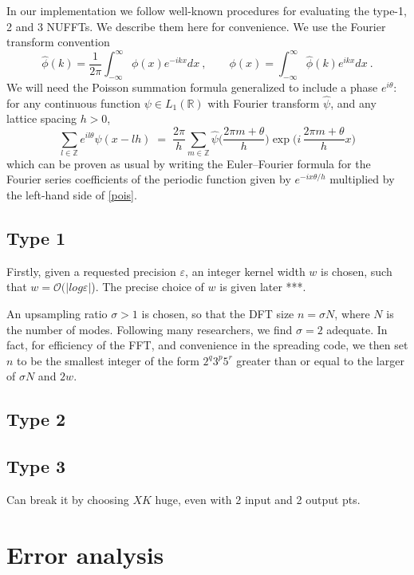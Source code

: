 \documentclass[10pt]{article}
\newcommand{\be}{\begin{equation}}
\newcommand{\ee}{\end{equation}}
\newcommand{\RR}{\mathbb{R}}
\newcommand{\ZZ}{\mathbb{Z}}
\newcommand{\eps}{\varepsilon}
\newcommand{\bigO}{{\mathcal O}}
\newcommand{\intR}{\int_{-\infty}^\infty}
\newcommand{\rat}{\sigma}          %
\begin{document}
In our implementation we follow well-known procedures 
for evaluating the type-1, 2 and 3 NUFFTs.
We describe them here for convenience.
We use the Fourier transform convention
\be
\hat\phi(k) = \frac{1}{2\pi} \intR \phi(x) e^{-ikx} dx
~,\qquad
\phi(x) = \intR \hat\phi(k) e^{ikx} dx
~.
\label{ft}
\ee
We will need the
Poisson summation formula
\cite{apostol} generalized to include a phase $e^{i\theta}$:
for any continuous function
$\psi \in L_1(\RR)$ with Fourier transform $\hat\psi$,
and any lattice spacing $h>0$,
\be
\sum_{l\in\ZZ} e^{il\theta} \psi(x - lh) \; = \;
\frac{2\pi}{h} \sum_{m\in\ZZ}
\hat\psi\biggl(\frac{2\pi m + \theta}{h}\biggr)
\exp \biggl({i\,\frac{2\pi m + \theta}{h}x}\biggr)
\label{pois}
\ee
which can be proven as usual by writing the Euler--Fourier
formula for the Fourier series coefficients
of the periodic function given by $e^{-ix\theta/h}$
multiplied by the left-hand side of \eqref{pois}.



\subsection{Type 1}

Firstly, given a requested precision $\eps$, an integer kernel width $w$
is chosen, such that $w=\bigO(|log \eps|$). The precise choice of
$w$ is given later ***.

An upsampling ratio $\rat>1$ is chosen,
so that the DFT size $n = \rat N$, where $N$ is the number of modes.
Following many researchers, we find $\rat=2$ adequate.
In fact, for efficiency of the FFT, and convenience in the spreading
code, we then set $n$ to be the smallest
integer of the form $2^q3^p5^r$ greater than or equal to the
larger of $\rat N$ and $2w$.





\subsection{Type 2}


\subsection{Type 3}

Can break it by choosing $XK$ huge, even with 2 input and 2 output pts.


\section{Error analysis}
\end{document}
